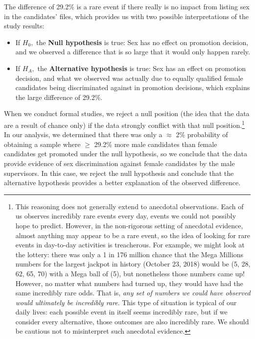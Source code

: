 \documentclass[
  10pt,
  openany]{book}
\begin{document}
The difference of 29.2\% is a rare event if there really is no impact from listing sex in the candidates' files, which provides us with two possible interpretations of the study results:

\begin{itemize}
\item
  If \(H_0,\) the \textbf{Null hypothesis} is true: Sex has no effect on promotion decision, and we observed a difference that is so large that it would only happen rarely.
\item
  If \(H_A,\) the \textbf{Alternative hypothesis} is true: Sex has an effect on promotion decision, and what we observed was actually due to equally qualified female candidates being discriminated against in promotion decisions, which explains the large difference of 29.2\%.
\end{itemize}

When we conduct formal studies, we reject a null position (the idea that the data are a result of chance only) if the data strongly conflict with that null position.\footnote{This reasoning does not generally extend to anecdotal observations.
  Each of us observes incredibly rare events every day, events we could not possibly hope to predict.
  However, in the non-rigorous setting of anecdotal evidence, almost anything may appear to be a rare event, so the idea of looking for rare events in day-to-day activities is treacherous.
  For example, we might look at the lottery: there was only a 1 in 176 million chance that the Mega Millions numbers for the largest jackpot in history (October 23, 2018) would be (5, 28, 62, 65, 70) with a Mega ball of (5), but nonetheless those numbers came up!
  However, no matter what numbers had turned up, they would have had the same incredibly rare odds.
  That is, \emph{any set of numbers we could have observed would ultimately be incredibly rare}.
  This type of situation is typical of our daily lives: each possible event in itself seems incredibly rare, but if we consider every alternative, those outcomes are also incredibly rare.
  We should be cautious not to misinterpret such anecdotal evidence.}
In our analysis, we determined that there was only a \(\approx\) 2\% probability of obtaining a sample where \(\geq\) 29.2\% more male candidates than female candidates get promoted under the null hypothesis, so we conclude that the data provide evidence of sex discrimination against female candidates by the male supervisors.
In this case, we reject the null hypothesis and conclude that the alternative hypothesis provides a better explanation of the observed difference.
\end{document}
